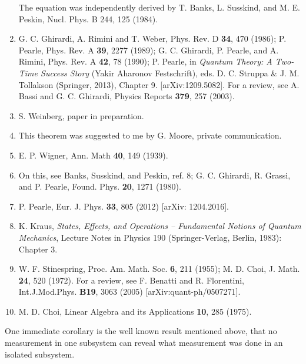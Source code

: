 \begin{enumerate}
The equation was independently derived by T. Banks, L. Susskind, and M. E. Peskin, Nucl. Phys. B 244, 125 (1984).
\item G. C. Ghirardi, A. Rimini  
and T. Weber, Phys. Rev. D {\bf 34}, 470 (1986);  P. Pearle, Phys. Rev. A {\bf 39}, 2277 (1989);  G. C. Ghirardi, P. Pearle, and A. Rimini, Phys. Rev. A {\bf 42}, 78 (1990); P. Pearle, in {\em Quantum Theory: A Two-Time Success Story} (Yakir Aharonov Festschrift), eds. D. C. Struppa \& J. M. Tollakson (Springer, 2013), Chapter 9. [arXiv:1209.5082].  For a review, see A. Bassi and G. C. Ghirardi, Physics Reports {\bf 379}, 257 (2003).
\item S. Weinberg, paper in preparation.
\item This theorem was suggested to me by G. Moore, private communication.
\item E. P. Wigner, Ann. Math {\bf 40}, 149 (1939).
\item On this, see Banks, Susskind, and Peskin, ref. 8; G. C. Ghirardi, R. Grassi, and P. Pearle, Found. Phys. {\bf 20}, 1271 (1980).
\item P. Pearle, Eur. J. Phys. {\bf 33}, 805 (2012) [arXiv: 1204.2016].
\item K. Kraus, {\em States, Effects, and Operations -- Fundamental Notions of Quantum Mechanics}, Lecture Notes in Physics 190 (Springer-Verlag, Berlin, 1983): Chapter 3. 
\item W. F. Stinespring, Proc. Am. Math. Soc. {\bf 6}, 211 (1955); M. D. Choi, J. Math. {\bf 24}, 520 (1972).  For a review, see F. Benatti and R. Florentini,  Int.J.Mod.Phys. {\bf B19}, 3063 (2005) [arXiv:quant-ph/0507271].
\item M. D. Choi, Linear Algebra and its Applications {\bf 10}, 285 (1975).
 
\end{enumerate}



One immediate corollary is the well known result mentioned above, that no measurement in one subsystem can reveal what measurement was done in an isolated subsystem.


